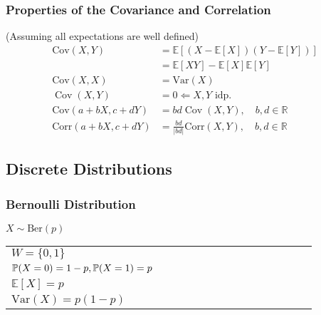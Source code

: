 \subsubsection{Properties of the Covariance and Correlation}
(Assuming all expectations are well defined)
\noindent\begin{align*}
    \mathrm{Cov}(X,Y)        & =\mathbb{E}[(X-\mathbb{E}[X])(Y-\mathbb{E}[Y])]             \\
                             & = \mathbb{E}[XY]-\mathbb{E}[X]\mathbb{E}[Y]                 \\
    \mathrm{Cov}(X,X)        & = \mathrm{Var}(X)                                           \\
    \operatorname{Cov}(X,Y)  & = 0 \Leftarrow X,Y\text{ idp.}                             \\
    \mathrm{Cov}(a+bX,c+dY)  & =bd\operatorname{Cov}(X,Y),\quad b,d\in\mathbb{R}           \\
    \mathrm{Corr}(a+bX,c+dY) & ={\frac{bd}{|bd|}}\mathrm{Corr}(X,Y),\quad b,d\in\mathbb{R}
\end{align*}

\subsection{Discrete Distributions}

\subsubsection{Bernoulli Distribution}
$X \sim \mathrm{Ber}(p)$

\renewcommand{\arraystretch}{1.3}
\setlength{\oldtabcolsep}{\tabcolsep}\setlength\tabcolsep{3pt}

\begin{tabularx}{\linewidth}{@{}p{0.5\linewidth}p{0.49\linewidth}@{}}
    $W=\{0,1\}$                                     &
    \multirow{4}{*}{
        
    }                                                 \\
    $\mathbb{P}(X=0)=1-p,\newline\mathbb{P}(X=1)=p$ & \\
    $\mathbb{E}[X] = p$                             & \\
    $\mathrm{Var}(X) = p(1-p)$                      &
\end{tabularx}

\renewcommand{\arraystretch}{1}
\setlength\tabcolsep{\oldtabcolsep}



